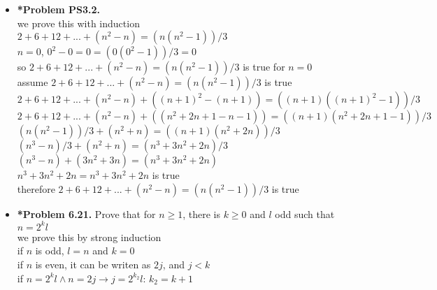 \documentclass[11pt]{article}
\def\AND{\wedge}
\def\imp{\rightarrow}
\begin{document}
\begin{itemize}
\vspace{0.1in}

\item \textbf{*Problem PS3.2.}
\\we prove this with induction
\\$2+6+12+...+(n^2-n)=(n(n^2-1))/3$
\\$n=0$, $0^2-0=0=(0(0^2-1))/3=0$
\\ so $2+6+12+...+(n^2-n)=(n(n^2-1))/3$ is true for $n=0$
\\assume $2+6+12+...+(n^2-n)=(n(n^2-1))/3$ is true
\\$2+6+12+...+(n^2-n)+((n+1)^2-(n+1))=((n+1)((n+1)^2-1))/3$
\\$2+6+12+...+(n^2-n)+((n^2+2n+1-n-1))=((n+1)(n^2+2n+1-1))/3$
\\$(n(n^2-1))/3+(n^2+n)=((n+1)(n^2+2n))/3$
\\$(n^3-n)/3+(n^2+n)=(n^3+3n^2+2n)/3$
\\$(n^3-n)+(3n^2+3n)=(n^3+3n^2+2n)$
\\$n^3+3n^2+2n=n^3+3n^2+2n$ is true
\\therefore $2+6+12+...+(n^2-n)=(n(n^2-1))/3$ is true


\vspace{0.1in}

\item \textbf{*Problem 6.21.}
Prove that for $n\ge 1$, there is $k\ge 0$ and $l$ odd such that $n=2^kl$
\\we prove this by strong induction
\\if $n$ is odd, $l=n$ and $k=0$
\\if $n$ is even, it can be writen as $2j$, and $j<k$
\\if $n=2^kl \AND n=2j \imp j=2^{k_2}l$: $k_2=k+1$
\\
\\
\\

\end{itemize}
\end{document}
